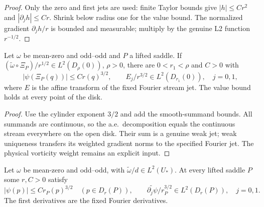\begin{proof}
\leanok
Only the zero and first jets are used: finite Taylor bounds give
$|h|\le Cr^2$ and $|\partial_jh|\le Cr$.
Shrink below radius one for the value bound.
The normalized gradient $\partial_jh/r$ is bounded and measurable;
multiply by the genuine L2 function $r^{-1/2}$.
\end{proof}

\begin{lemma}
\label{lem:dd-saddle-subcritical-cylinder}
\leanok
Let $\omega$ be mean-zero and odd--odd and $P$ a lifted saddle.
If $(\widetilde\omega\circ\Xi_P)/r^{1/2}\in L^2(D_\rho(0))$, $\rho>0$,
there are $0<r_1<\rho$ and $C>0$ with
\[
 |\psi(\Xi_P(q))|\le Cr(q)^{3/2},\qquad
 E_j/r^{3/2}\in L^2(D_{r_1}(0)),\quad j=0,1,
\]
where $E$ is the affine transform of the fixed Fourier stream jet.
The value bound holds at every point of the disk.
\end{lemma}

\begin{proof}
\leanok
Use the cylinder exponent $3/2$ and add the smooth-summand bounds.
All summands are continuous, so the a.e.\ decomposition equals the
continuous stream everywhere on the open disk.
Their sum is a genuine weak jet; weak uniqueness transfers its weighted
gradient norms to the specified Fourier jet.
The physical vorticity weight remains an explicit input.
\end{proof}

\begin{lemma}
\label{lem:dd-saddle-subcritical-from-first-weight}
\leanok
Let $\omega$ be mean-zero and odd--odd, with
$\widetilde\omega/d\in L^2(U_*)$.
At every lifted saddle $P$ some $r,C>0$ satisfy
\[
 |\psi(p)|\le C r_P(p)^{3/2}\quad(p\in D_r(P)),\qquad
 \widetilde{\partial_j\psi}/r_P^{3/2}\in L^2(D_r(P)),\quad j=0,1.
\]
The first derivatives are the fixed Fourier derivatives.
\end{lemma}

